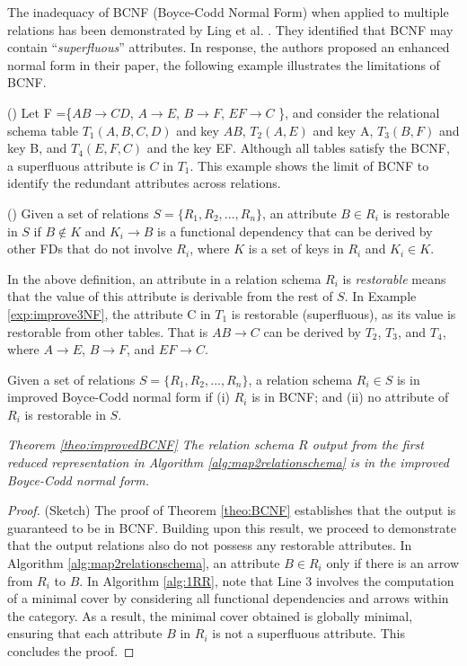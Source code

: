 The inadequacy of BCNF (Boyce-Codd Normal Form) when applied to multiple relations has been demonstrated by Ling et al. \cite{journals/tods/LingTK81}. They identified that BCNF may contain ``\textit{superfluous}''  attributes. In response, the authors proposed an enhanced normal form in their paper, the following example illustrates the limitations of BCNF.

\begin{example} (\cite{journals/tods/LingTK81})
Let F =\{$AB \to CD$, $A \to E$, $B \to F$, $EF \to C$ \}, and consider the relational schema table $T_1(A,B,C,D)$ and key $AB$, $T_2(A,E)$ and key A, $T_3(B,F)$ and key B, and $T_4(E,F,C)$ and the key EF.  Although all tables satisfy the BCNF, a superfluous attribute is $C$ in $T_1$. This example shows the limit of BCNF to identify the redundant attributes across relations. \label{exp:improve3NF} 
\end{example}

\begin{definition} (\cite{journals/tods/LingTK81}) Given a set of relations $S = \{R_1,R_2,...,R_n\}$,  an attribute $B \in R_i$ is restorable in $S$ if $B \notin  K$ and  $K_i \to B$ is a functional dependency that can be derived by other FDs that do not involve $R_i$, where $K$ is a set of keys in $R_i$ and $K_i \in K$.
\end{definition}

In the above definition,  an attribute in a relation schema $R_i$ is \textit{restorable} means that the value of this attribute is derivable from the rest of $S$. In Example \ref{exp:improve3NF}, the attribute C in $T_1$ is restorable (superfluous), as its value is restorable from other tables. That is $AB \to C$ can be derived by $T_2$, $T_3$, and $T_4$, where $A \to E$, $B \to F$, and $EF \to C$.

\begin{definition} Given a set of relations $S = \{R_1,R_2,...,R_n\}$,  a relation schema $R_i \in S$ is in improved Boyce-Codd normal form if (i) $R_i$ is in BCNF; and (ii) no attribute of $R_i$ is restorable in $S$.    
\end{definition}

\noindent \textit{Theorem \ref{theo:improvedBCNF}   The relation schema $R$ output from the first reduced representation in Algorithm  \ref{alg:map2relationschema} is in the improved  Boyce-Codd normal form.}



\begin{proof} (Sketch) The proof of Theorem \ref{theo:BCNF} establishes that the output is guaranteed to be in BCNF. Building upon this result, we proceed to demonstrate that the output relations also do not possess any restorable attributes. In Algorithm \ref{alg:map2relationschema}, an attribute $B \in R_i$ only if there is an arrow from $R_i$ to $B$. In Algorithm \ref{alg:1RR}, note that Line 3 involves the computation of a minimal cover by considering all functional dependencies and arrows within the category. As a result, the minimal cover obtained is globally minimal, ensuring that each attribute $B$ in $R_i$ is not a superfluous attribute.   This concludes the proof.
\end{proof}

